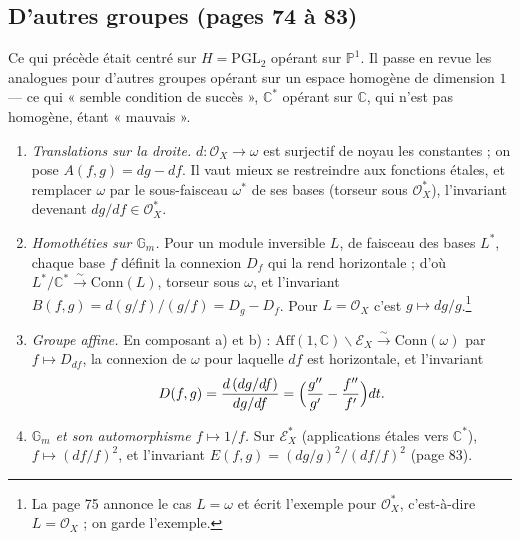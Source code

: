 \documentclass[11pt,a4paper]{article}
\begin{document}
\subsection*{D'autres groupes (pages 74 à 83)}

Ce qui précède était centré sur $H = \mathrm{PGL}_2$ opérant sur
$\mathbb{P}^1$. Il passe en revue les analogues pour d'autres groupes opérant
sur un espace homogène de dimension $1$ — ce qui « semble condition de
succès », $\mathbb{C}^*$ opérant sur $\mathbb{C}$, qui n'est pas homogène,
étant « mauvais ».
\begin{enumerate}
  \item[a)] \emph{Translations sur la droite.} $d : \mathcal{O}_X \to \omega$ est
  surjectif de noyau les constantes ; on pose $A(f,g) = dg - df$. Il vaut
  mieux se restreindre aux fonctions étales, et remplacer $\omega$ par le
  sous-faisceau $\omega^*$ de ses bases (torseur sous $\mathcal{O}_X^*$),
  l'invariant devenant $dg/df \in \mathcal{O}_X^*$.
  \item[b)] \emph{Homothéties sur $\mathbb{G}_m$.} Pour un module inversible
  $L$, de faisceau des bases $L^*$, chaque base $f$ définit la connexion
  $D_f$ qui la rend horizontale ; d'où $L^*/\mathbb{C}^* \xrightarrow{\sim}
  \mathrm{Conn}(L)$, torseur sous $\omega$, et l'invariant
  $B(f,g) = d(g/f)/(g/f) = D_g - D_f$. Pour $L = \mathcal{O}_X$ c'est
  $g \mapsto dg/g$.\footnote{La page 75 annonce le cas $L = \omega$ et écrit
  l'exemple pour $\mathcal{O}_X^*$, c'est-à-dire $L = \mathcal{O}_X$ ; on garde
  l'exemple.}
  \item[c)] \emph{Groupe affine.} En composant a) et b) :
  $\mathrm{Aff}(1,\mathbb{C})\backslash\mathcal{E}_X \xrightarrow{\sim}
  \mathrm{Conn}(\omega)$ par $f \mapsto D_{df}$, la connexion de $\omega$ pour
  laquelle $df$ est horizontale, et l'invariant
  \[
    D(f,g) = \frac{d\,(dg/df)}{dg/df} = \Bigl(\frac{g''}{g'} -
    \frac{f''}{f'}\Bigr)dt .
  \]
  \item[d)] \emph{$\mathbb{G}_m$ et son automorphisme $f \mapsto 1/f$.} Sur
  $\mathcal{E}_X^*$ (applications étales vers $\mathbb{C}^*$), $f \mapsto
  (df/f)^2$, et l'invariant $E(f,g) = (dg/g)^2/(df/f)^2$ (page 83).
\end{enumerate}
\end{document}
